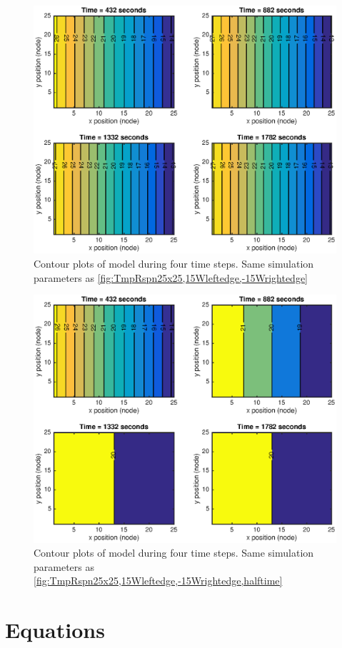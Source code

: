 \documentclass[10pt,twocolumn]{article}
\begin{document}
\begin{figure}
	\center
	\includegraphics[width=0.8\linewidth]{CtrTnst25x25,15Wleftedge,-15Wrightedge.eps}
	\caption{Contour plots of model during four time steps. Same simulation parameters as \autoref{fig:TmpRspn25x25,15Wleftedge,-15Wrightedge}}
	\label{fig:CtrTnst25x25,15Wleftedge,-15Wrightedge}
\end{figure}


\begin{figure}
	\center
	\includegraphics[width=0.8\linewidth]{CtrTnst25x25,15Wleftedge,-15Wrightedge,halftime.eps}
	\caption{Contour plots of model during four time steps. Same simulation parameters as \autoref{fig:TmpRspn25x25,15Wleftedge,-15Wrightedge,halftime}}
	\label{fig:CtrTnst25x25,15Wleftedge,-15Wrightedge,halftime}
\end{figure}

\twocolumn
\section{Equations}
\end{document}
